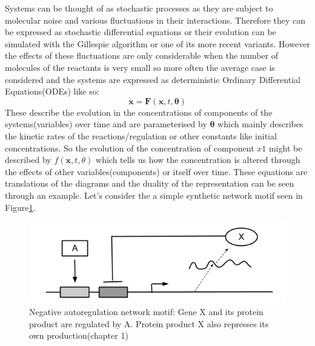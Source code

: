 \documentclass[12pt,a4paper,titlepage]{article}
\begin{document}
Systems can be thought of as stochastic processes as they are subject to molecular noise and various fluctuations in their interactions. Therefore they can be expressed as stochastic differential equations or their evolution can be simulated with the Gillespie algorithm\cite{gillespie1977exact} or one of its more recent variants\cite{gillespie2001approximate, gibson2000efficient}. However the effects of these fluctuations are only considerable when the number of molecules of the reactants is very small so more often the average case is considered and the systems are expressed as deterministic Ordinary Differential Equations(ODEs) like so: 
\begin{equation*}
\mathbf{\dot x} = \mathbf{F}(\mathbf{x}, t, \mathbf{\theta})
\end{equation*}
 These describe the evolution in the concentrations of components of the systems(variables) over time and are parameterised by $\mathbf{\theta}$ which mainly describes the kinetic rates of the reactions/regulation or other constants like initial concentrations. So the evolution of the concentration of component $x1$ might be described by $f(\mathbf{x}, t, \theta)$ which tells us how the concentration is altered through the effects of other variables(components) or itself over time. These equations are translations of the diagrams and the duality of the representation can be seen through an example. Let's consider the a simple synthetic network motif seen in Figure\ref{fig:simple_motif}. 
\begin{figure}
\centering
\includegraphics[width=0.5\linewidth]{neg_autoregulation}
\caption{Negative autoregulation network motif: Gene X and its protein product are regulated by A. Protein product X also represses its own production\cite{alon2007introduction}(chapter 1)}
\label{fig:simple_motif}
\end{figure}
\end{document}

